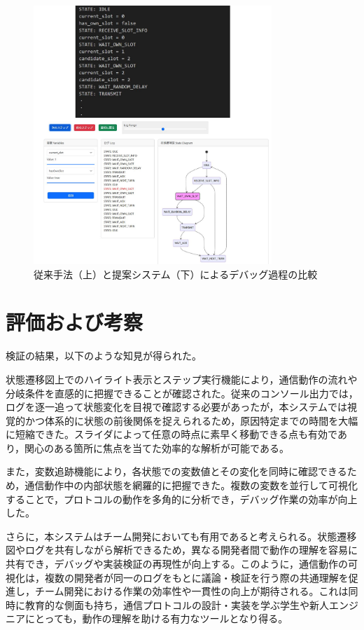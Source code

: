 \documentclass[technicalreport]{ieicej}
\begin{document}
\begin{figure}[h]
  \centering
  \includegraphics[width=90mm]{./images/3_debug_comparison.pdf}
  \caption{従来手法（上）と提案システム（下）によるデバッグ過程の比較}
  \label{fig:debug-comparison}
\end{figure}




\section{評価および考察}
検証の結果，以下のような知見が得られた。

状態遷移図上でのハイライト表示とステップ実行機能により，通信動作の流れや分岐条件を直感的に把握できることが確認された。従来のコンソール出力では，ログを逐一追って状態変化を目視で確認する必要があったが，本システムでは視覚的かつ体系的に状態の前後関係を捉えられるため，原因特定までの時間を大幅に短縮できた。スライダによって任意の時点に素早く移動できる点も有効であり，関心のある箇所に焦点を当てた効率的な解析が可能である。

また，変数追跡機能により，各状態での変数値とその変化を同時に確認できるため，通信動作中の内部状態を網羅的に把握できた。複数の変数を並行して可視化することで，プロトコルの動作を多角的に分析でき，デバッグ作業の効率が向上した。

さらに，本システムはチーム開発においても有用であると考えられる。状態遷移図やログを共有しながら解析できるため，異なる開発者間で動作の理解を容易に共有でき，デバッグや実装検証の再現性が向上する。このように，通信動作の可視化は，複数の開発者が同一のログをもとに議論・検証を行う際の共通理解を促進し，チーム開発における作業の効率性や一貫性の向上が期待される。これは同時に教育的な側面も持ち，通信プロトコルの設計・実装を学ぶ学生や新人エンジニアにとっても，動作の理解を助ける有力なツールとなり得る。
\end{document}
